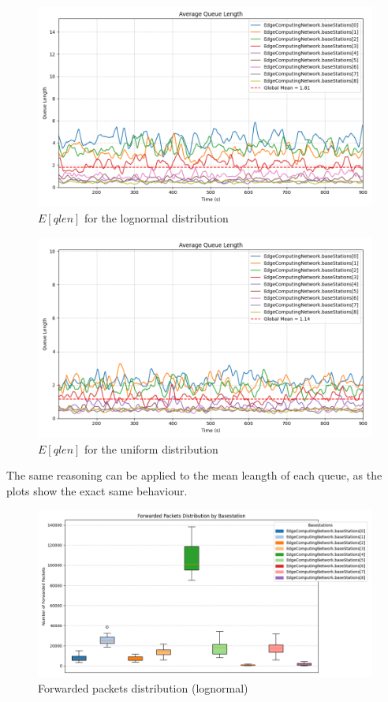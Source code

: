 \documentclass{report}
\begin{document}
\begin{figure}[H]
    \centering
    \includegraphics[width=\textwidth]{img/plots/log_1e3_B/qlen.png}
    \caption{$E[qlen]$ for the lognormal distribution}
\end{figure}

\begin{figure}[H]
    \centering
    \includegraphics[width=\textwidth]{img/plots/uni_1e3_B/qlen.png}
    \caption{$E[qlen]$ for the uniform distribution}
\end{figure}


\begin{flushleft}
The same reasoning can be applied to the mean leangth of each queue, as the plots show the exact same behaviour.
\end{flushleft}

\begin{figure}[H]
    \centering
    \includegraphics[width=\textwidth]{img/plots/log_1e3_B/forwarded.png}
    \caption{Forwarded packets distribution (lognormal)}
\end{figure}
\end{document}

